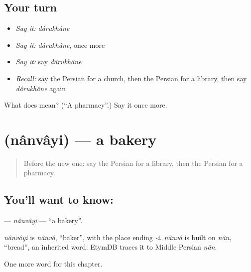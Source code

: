 \subsection*{Your turn}
\begin{itemize}
\raggedright
  \item \emph{Say it:} \emph{dârukhâne}
  \item \emph{Say it:} \emph{dârukhâne}, once more
  \item \emph{Say it:} say \emph{dârukhâne}
  \item \emph{Recall:} say the Persian for a church, then the Persian for a library, then say \emph{dârukhâne} again
\end{itemize}

\begin{tcolorbox}[breakable,colback=teal!4,colframe=teal!35!black,title={Before you move on}]
What does  mean? (\textquotedblleft{}A pharmacy\textquotedblright{}.) Say it once more.
\end{tcolorbox}
\section[\texorpdfstring{\fa{نانوایی} (nânvâyi)}{نانوایی (nânvâyi)}]{ (nânvâyi) — a bakery}

\label{lesson:FA-C88-nanvayi}



\begin{quote}
Before the new one: say the Persian for a library, then the Persian for a pharmacy.
\end{quote}

\subsection*{You'll want to know: }
\textbf{} — \emph{nânvâyi} — \textquotedblleft{}a bakery\textquotedblright{}.

\begin{cousinweb}
\emph{nânvâyi} is \emph{nânvâ}, \textquotedblleft{}baker\textquotedblright{}, with the place ending \emph{-i}. \emph{nânvâ} is built on \emph{nân}, \textquotedblleft{}bread\textquotedblright{}, an inherited word: EtymDB traces it to Middle Persian \emph{nān}.
\end{cousinweb}

\begin{grammarlens}[title={What you've built}]
One more word for this chapter.
\end{grammarlens}

